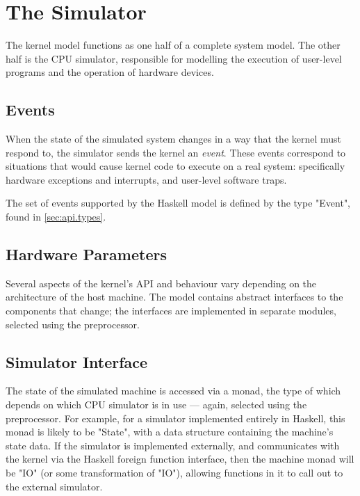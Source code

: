 \section[simulator]{The Simulator}

The kernel model functions as one half of a complete system model. The other half is the CPU simulator, responsible for modelling the execution of user-level programs and the operation of hardware devices.

\subsection{Events}

When the state of the simulated system changes in a way that the kernel must respond to, the simulator sends the kernel an \emph{event}. These events correspond to situations that would cause kernel code to execute on a real system: specifically hardware exceptions and interrupts, and user-level software traps.

The set of events supported by the Haskell model is defined by the type "Event", found in \autoref{sec:api.types}.

\subsection{Hardware Parameters}

Several aspects of the kernel's API and behaviour vary depending on the architecture of the host machine. The model contains abstract interfaces to the components that change; the interfaces are implemented in separate modules, selected using the preprocessor.

\subsection[monad]{Simulator Interface}

The state of the simulated machine is accessed via a monad, the type of which depends on which CPU simulator is in use --- again, selected using the preprocessor. For example, for a simulator implemented entirely in Haskell, this monad is likely to be "State", with a data structure containing the machine's state data. If the simulator is implemented externally, and communicates with the kernel via the Haskell foreign function interface, then the machine monad will be "IO" (or some transformation of "IO"), allowing functions in it to call out to the external simulator.


